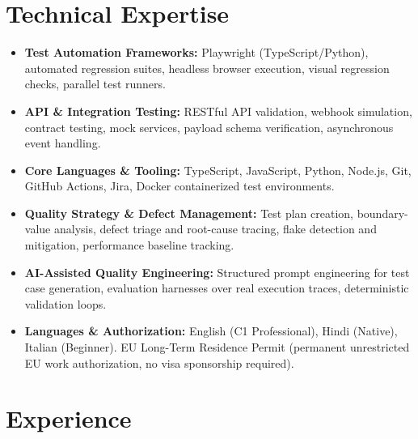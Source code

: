 \documentclass[10pt,a4paper]{article}
\begin{document}
\section{Technical Expertise}
\begin{itemize}
  \item \textbf{Test Automation Frameworks:} Playwright (TypeScript/Python), automated regression suites, headless browser execution, visual regression checks, parallel test runners.
  \item \textbf{API \& Integration Testing:} RESTful API validation, webhook simulation, contract testing, mock services, payload schema verification, asynchronous event handling.
  \item \textbf{Core Languages \& Tooling:} TypeScript, JavaScript, Python, Node.js, Git, GitHub Actions, Jira, Docker containerized test environments.
  \item \textbf{Quality Strategy \& Defect Management:} Test plan creation, boundary-value analysis, defect triage and root-cause tracing, flake detection and mitigation, performance baseline tracking.
  \item \textbf{AI-Assisted Quality Engineering:} Structured prompt engineering for test case generation, evaluation harnesses over real execution traces, deterministic validation loops.
  \item \textbf{Languages \& Authorization:} English (C1 Professional), Hindi (Native), Italian (Beginner). EU Long-Term Residence Permit (permanent unrestricted EU work authorization, no visa sponsorship required).
\end{itemize}

\section{Experience}
\end{document}

